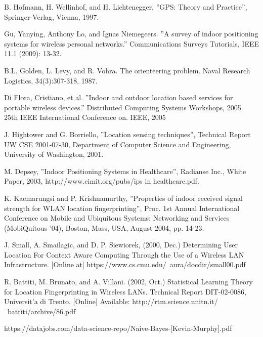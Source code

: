 \documentclass[12pt]{informatics-report}
\begin{document}


\begin{thebibliography}{99}

 B. Hofmann, H. Wellinhof, and H. Lichtenegger, ”GPS: Theory and Practice”, Springer-Verlag, Vienna, 1997.

 Gu, Yanying, Anthony Lo, and Ignas Niemegeers. ”A survey of indoor positioning systems for wireless personal networks.” Communications Surveys Tutorials, IEEE 11.1 (2009):
13-32.

 B.L. Golden, L. Levy, and R. Vohra. The orienteering problem. Naval Research Logistics, 34(3):307-318, 1987.

 Di Flora, Cristiano, et al. ”Indoor and outdoor location based services for portable
wireless devices.” Distributed Computing Systems Workshops, 2005. 25th IEEE International
Conference on. IEEE, 2005

 J. Hightower and G. Borriello, ”Location sensing techniques”, Technical Report UW CSE 2001-07-30, Department of Computer Science and Engineering, University of Washington, 2001.

 M. Depsey, ”Indoor Positioning Systems in Healthcare”, Radianse Inc., White Paper, 2003, http://www.cimit.org/pubs/ips in healthcare.pdf.

 K. Kaemarungsi and P. Krishnamurthy, ”Properties of indoor received signal strength for WLAN location fingerprinting”, Proc. 1st Annual International Conference on Mobile and Ubiquitous Systems: Networking and Services (MobiQuitous ’04), Boston, Mass, USA, August 2004, pp. 14-23.

 J. Small, A. Smailagic, and D. P. Siewiorek, (2000, Dec.) Determining User Location For Context Aware Computing Through the Use of a Wireless LAN Infrastructure. [Online at] https://www.cs.cmu.edu/~aura/docdir/small00.pdf

 R. Battiti, M. Brunato, and A. Villani. (2002, Oct.) Statistical Learning Theory for Location Fingerprinting in Wireless LANs. Technical Report DIT-02-0086, Universit’a di Trento. [Online] Available: http://rtm.science.unitn.it/ ~battiti/archive/86.pdf

 https://datajobs.com/data-science-repo/Naive-Bayes-[Kevin-Murphy].pdf


\end{thebibliography}
\end{document}

